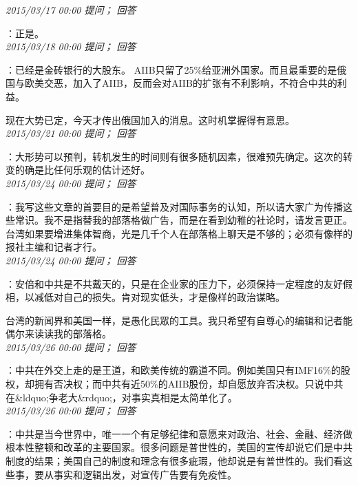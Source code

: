 \documentclass[twocolumn]{ctexart}
\begin{document}
\textit{\hfill\noindent\small 2015/03/17 00:00 提问； 回答}

：正是。\\

\textit{\hfill\noindent\small 2015/03/18 00:00 提问； 回答}

：已经是金砖银行的大股东。 AIIB只留了25\%给亚洲外国家。而且最重要的是俄国与欧美交恶，加入了AIIB，反而会对AIIB的扩张有不利影响，不符合中共的利益。

现在大势已定，今天才传出俄国加入的消息。这时机掌握得有意思。\\

\textit{\hfill\noindent\small 2015/03/21 00:00 提问； 回答}

：大形势可以预判，转机发生的时间则有很多随机因素，很难预先确定。这次的转变的确是比任何乐观的估计还好。\\

\textit{\hfill\noindent\small 2015/03/24 00:00 提问； 回答}

：我写这些文章的首要目的是希望普及对国际事务的认知，所以请大家广为传播这些常识。我不是指替我的部落格做广告，而是在看到幼稚的社论时，请发言更正。台湾如果要增进集体智商，光是几千个人在部落格上聊天是不够的；必须有像样的报社主编和记者才行。\\

\textit{\hfill\noindent\small 2015/03/24 00:00 提问； 回答}

：安倍和中共是不共戴天的，只是在企业家的压力下，必须保持一定程度的友好假相，以减低对自己的损失。肯对现实低头，才是像样的政治谋略。

台湾的新闻界和美国一样，是愚化民眾的工具。我只希望有自尊心的编辑和记者能偶尔来读读我的部落格。\\

\textit{\hfill\noindent\small 2015/03/26 00:00 提问； 回答}

：中共在外交上走的是王道，和欧美传统的霸道不同。例如美国只有IMF16\%的股权，却拥有否决权；而中共有近50\%的AIIB股份，却自愿放弃否决权。只说中共在\&ldquo;争老大\&rdquo;，对事实真相是太简单化了。\\

\textit{\hfill\noindent\small 2015/03/26 00:00 提问； 回答}

：中共是当今世界中，唯一一个有足够纪律和意愿来对政治、社会、金融、经济做根本性整顿和改革的主要国家。很多问题是普世性的，美国的宣传却说它们是中共制度的结果；美国自己的制度和理念有很多疵瑕，他却说是有普世性的。我们看这些事，要从事实和逻辑出发，对宣传广告要有免疫性。\\
\end{document}
